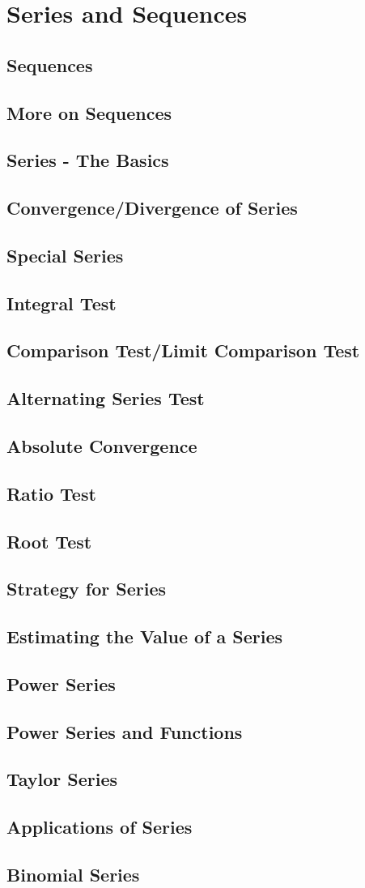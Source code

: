 \documentclass[../satmath.tex]{subfiles}
\begin{document}
\chapter{Series and Sequences}
\section{Sequences}
\section{More on Sequences}
\section{Series - The Basics}
\section{Convergence/Divergence of Series}
\section{Special Series}
\section{Integral Test}
\section{Comparison Test/Limit Comparison Test}
\section{Alternating Series Test}
\section{Absolute Convergence}
\section{Ratio Test}
\section{Root Test}
\section{Strategy for Series}
\section{Estimating the Value of a Series}
\section{Power Series}
\section{Power Series and Functions}
\section{Taylor Series}
\section{Applications of Series}
\section{Binomial Series}
\end{document}
